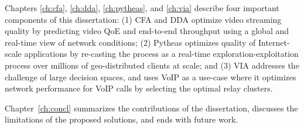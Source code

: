 Chapters \ref{ch:cfa}, \ref{ch:dda}, \ref{ch:pytheas}, and \ref{ch:via} 
describe four important components of this dissertation: 
(1) CFA and DDA optimize video streaming quality by predicting 
video QoE and end-to-end throughput using a global and real-time view of 
network conditions;
(2) Pytheas optimizes quality of Internet-scale applications by re-casting
the \ddn process as a real-time exploration-exploitation process 
over millions of geo-distributed clients at scale; and
(3) VIA addresses the challenge of large decision spaces, and uses 
VoIP as a use-case where it optimizes network performance for VoIP calls 
by selecting the optimal relay clusters.

Chapter~\ref{ch:concl} summarizes the contributions of the dissertation, 
discusses the limitations of the proposed solutions, and ends with future 
work.










